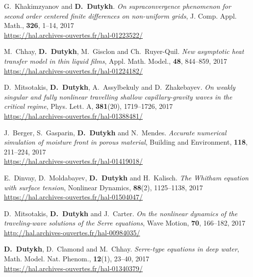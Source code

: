 \documentclass[final, a4paper, oneside, 12pt]{article}
\numberwithin{equation}{section}
\begin{document}
\begin{etaremune}
  
  \item G.~Khakimzyanov and \textbf{D.~Dutykh}. \textit{On supraconvergence phenomenon for second order centered finite differences on non-uniform grids}, J. Comp. Appl. Math., \textbf{326}, 1--14, 2017 \\ %
  \url{https://hal.archives-ouvertes.fr/hal-01223522/}

  \item M.~Chhay, \textbf{D.~Dutykh}, M.~Gisclon and Ch.~Ruyer-Quil. \textit{New asymptotic heat transfer model in thin liquid films}, Appl. Math. Model., \textbf{48}, 844--859, 2017 \\ %
  \url{https://hal.archives-ouvertes.fr/hal-01224182/}
  
  \item D.~Mitsotakis, \textbf{D.~Dutykh}, A.~Assylbekuly and D.~Zhakebayev. \textit{On weakly singular and fully nonlinear travelling shallow capillary-gravity waves in the critical regime}, Phys. Lett. A, \textbf{381}(20), 1719--1726, 2017 \\ %
  \url{https://hal.archives-ouvertes.fr/hal-01388481/}
  
  \item J.~Berger, S.~Gasparin, \textbf{D.~Dutykh} and N.~Mendes. \textit{Accurate numerical simulation of moisture front in porous material}, Building and Environment, \textbf{118}, 211--224, 2017 \\ %
  \url{https://hal.archives-ouvertes.fr/hal-01419018/}
  
  \item E.~Dinvay, D.~Moldabayev, \textbf{D.~Dutykh} and H.~Kalisch. \textit{The Whitham equation with surface tension}, Nonlinear Dynamics, \textbf{88}(2), 1125--1138, 2017 \\ %
  \url{https://hal.archives-ouvertes.fr/hal-01504047/}

  \item D.~Mitsotakis, \textbf{D.~Dutykh} and J.~Carter. \textit{On the nonlinear dynamics of the traveling-wave solutions of the Serre equations}, Wave Motion, \textbf{70}, 166--182, 2017 \\ %
  \url{http://hal.archives-ouvertes.fr/hal-00984035/}

  \item \textbf{D.~Dutykh}, D.~Clamond and M.~Chhay. \textit{Serre-type equations in deep water}, Math. Model. Nat. Phenom., \textbf{12}(1), 23--40, 2017 \\ %
  \url{https://hal.archives-ouvertes.fr/hal-01340379/}


\end{etaremune}
\end{document}
